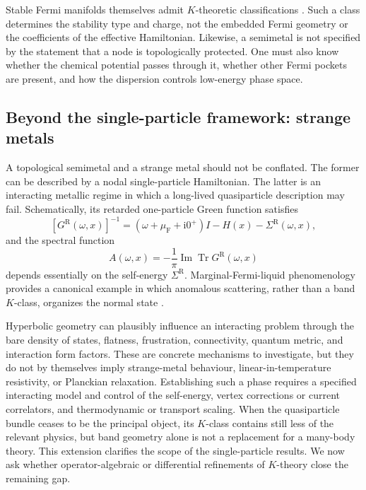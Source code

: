 \documentclass[11pt]{article}
\theoremstyle{definition}
\theoremstyle{remark}
\newcommand{\Tr}{\operatorname{Tr}}
\newcommand{\ii}{\mathrm i}
\begin{document}
Stable Fermi manifolds themselves admit \(K\)-theoretic classifications
\cite{HoravaFermiK}.  Such a class determines the stability type and charge,
not the embedded Fermi geometry or the coefficients of the effective
Hamiltonian.  Likewise, a semimetal is not specified by the statement that a
node is topologically protected.  One must also know whether the chemical
potential passes through it, whether other Fermi pockets are present, and how
the dispersion controls low-energy phase space.

\subsection{Beyond the single-particle framework: strange metals}

A topological semimetal and a strange metal should not be conflated.  The
former can be described by a nodal single-particle Hamiltonian.  The latter is
an interacting metallic regime in which a long-lived quasiparticle
description may fail.  Schematically, its retarded one-particle Green
function satisfies
\[
 [G^{\mathrm R}(\omega,x)]^{-1}
   =(\omega+\mu_{\mathrm F}+\ii0^+)I-H(x)-\Sigma^{\mathrm R}(\omega,x),
 \tag{8.13}\label{eq:interacting-green}
\]
and the spectral function
\[
 A(\omega,x)
    =-\frac1\pi\operatorname{Im}\Tr G^{\mathrm R}(\omega,x)
 \tag{8.14}\label{eq:spectral-function}
\]
depends essentially on the self-energy \(\Sigma^{\mathrm R}\).
Marginal-Fermi-liquid phenomenology provides a canonical example in which
anomalous scattering, rather than a band \(K\)-class, organizes the normal
state \cite{VarmaMarginalFermi}.

Hyperbolic geometry can plausibly influence an interacting problem through
the bare density of states, flatness, frustration, connectivity, quantum
metric, and interaction form factors.  These are concrete mechanisms to
investigate, but they do not by themselves imply strange-metal behaviour,
linear-in-temperature resistivity, or Planckian relaxation.  Establishing
such a phase requires a specified interacting model and control of the
self-energy, vertex corrections or current correlators, and thermodynamic or
transport scaling.  When the quasiparticle bundle ceases to be the principal
object, its \(K\)-class contains still less of the relevant physics, but band
geometry alone is not a replacement for a many-body theory.  This extension
clarifies the scope of the single-particle results.  We now ask whether
operator-algebraic or differential refinements of \(K\)-theory close the
remaining gap.
\end{document}
